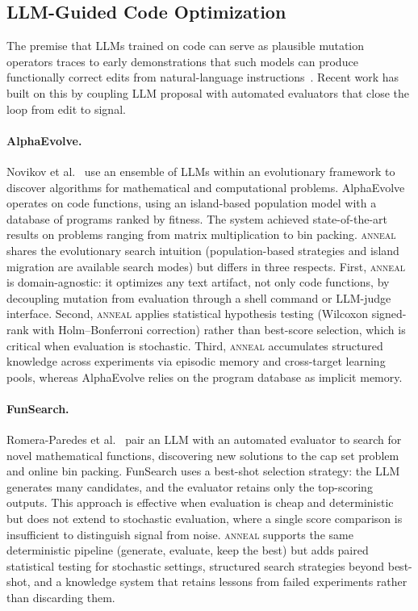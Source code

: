 \subsection{LLM-Guided Code Optimization}

The premise that LLMs trained on code can serve as plausible mutation operators traces to early demonstrations that such models can produce functionally correct edits from natural-language instructions~\cite{chen2021codex}.
Recent work has built on this by coupling LLM proposal with automated evaluators that close the loop from edit to signal.

\paragraph{AlphaEvolve.}
Novikov et al.~\cite{novikov2025alphaevolve} use an ensemble of LLMs within an evolutionary framework to discover algorithms for mathematical and computational problems.
AlphaEvolve operates on code functions, using an island-based population model with a database of programs ranked by fitness.
The system achieved state-of-the-art results on problems ranging from matrix multiplication to bin packing.
\textsc{anneal} shares the evolutionary search intuition (population-based strategies and island migration are available search modes) but differs in three respects.
First, \textsc{anneal} is domain-agnostic: it optimizes any text artifact, not only code functions, by decoupling mutation from evaluation through a shell command or LLM-judge interface.
Second, \textsc{anneal} applies statistical hypothesis testing (Wilcoxon signed-rank with Holm--Bonferroni correction) rather than best-score selection, which is critical when evaluation is stochastic.
Third, \textsc{anneal} accumulates structured knowledge across experiments via episodic memory and cross-target learning pools, whereas AlphaEvolve relies on the program database as implicit memory.

\paragraph{FunSearch.}
Romera-Paredes et al.~\cite{romera2024funsearch} pair an LLM with an automated evaluator to search for novel mathematical functions, discovering new solutions to the cap set problem and online bin packing.
FunSearch uses a best-shot selection strategy: the LLM generates many candidates, and the evaluator retains only the top-scoring outputs.
This approach is effective when evaluation is cheap and deterministic but does not extend to stochastic evaluation, where a single score comparison is insufficient to distinguish signal from noise.
\textsc{anneal} supports the same deterministic pipeline (generate, evaluate, keep the best) but adds paired statistical testing for stochastic settings, structured search strategies beyond best-shot, and a knowledge system that retains lessons from failed experiments rather than discarding them.


